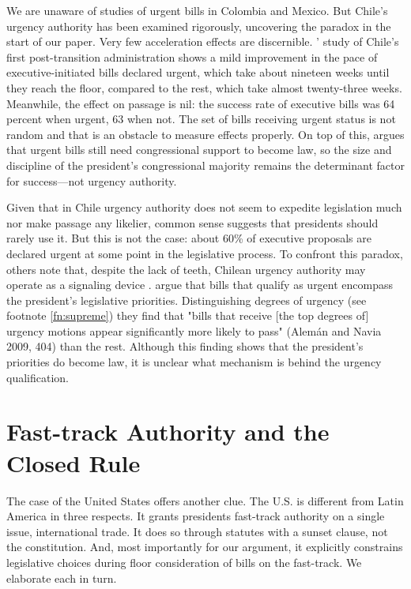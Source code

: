 \documentclass[letter,12pt]{article}
\begin{document}
We are unaware of studies of urgent bills in Colombia and Mexico. But Chile’s urgency authority has been examined rigorously, uncovering the paradox in the start of our paper. Very few acceleration effects are discernible. \citeauthor{siavelis.2002}' \citeyearpar{siavelis.2002} study of Chile’s first post-transition administration shows a mild improvement in the pace of executive-initiated bills declared urgent, which take about nineteen weeks until they reach the floor, compared to the rest, which take almost twenty-three weeks. Meanwhile, the effect on passage is nil: the success rate of executive bills was 64 percent when urgent, 63 when not. The set of bills receiving urgent status is not random and that is an obstacle to measure effects properly. On top of this, \citet[][, 51]{nolte.2003} argues that urgent bills still need congressional support to become law, so the size and discipline of the president’s congressional majority remains the determinant factor for success---not urgency authority.

Given that in Chile urgency authority does not seem to expedite legislation much nor make passage any likelier, common sense suggests that presidents should rarely use it. But this is not the case: about 60\% of executive proposals are declared urgent at some point in the legislative process. To confront this paradox, others note that, despite the lack of teeth, Chilean urgency authority may operate as a signaling device  \citep{berrios.gamboa.fiscChile.2006,aninat.exagCoop2006}. \citet{aleman.navia.UrgChi.2009} argue that bills that qualify as urgent encompass the president’s legislative priorities. Distinguishing degrees of urgency (see footnote \ref{fn:supreme}) they find that "bills that receive [the top degrees of] urgency motions appear significantly more likely to pass" (Alemán and Navia 2009, 404) than the rest. Although this finding shows that the president’s priorities do become law, it is unclear what mechanism is behind the urgency qualification.

\section*{Fast-track Authority and the Closed Rule}

The case of the United States offers another clue. The U.S. is different from Latin America in three respects. It grants presidents fast-track authority on a single issue, international trade. It does so through statutes with a sunset clause, not the constitution. And, most importantly for our argument, it explicitly constrains legislative choices during floor consideration of bills on the fast-track. We elaborate each in turn.
\end{document}
